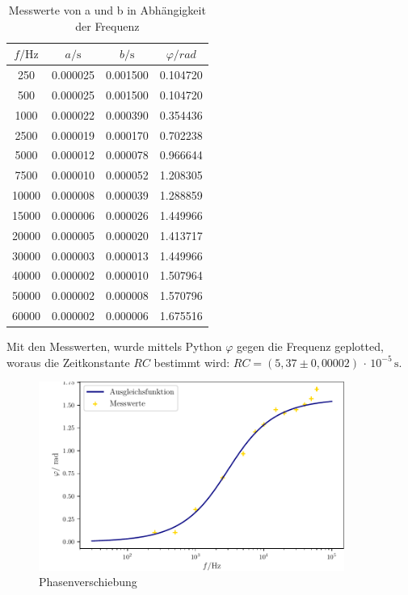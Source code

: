 \begin{table}
  \centering
  \caption{Messwerte von a und b in Abhängigkeit der Frequenz}
  \label{tab:ab}
  \begin{tabular}{c c c c}
    \toprule
    $f/\unit{\hertz}$ & $a/\unit{\second}$ & $b/\unit{\second}$ & $\varphi / rad$ \\
    \midrule      
      250 & 0.000025 & 0.001500 & 0.104720 \\
      500  &0.000025 & 0.001500 & 0.104720\\
      1000 & 0.000022&  0.000390 & 0.354436\\
      2500 & 0.000019 & 0.000170&  0.702238\\
      5000&  0.000012 & 0.000078&  0.966644\\
      7500 & 0.000010 & 0.000052 & 1.208305\\
      10000 & 0.000008 & 0.000039&  1.288859\\
      15000 & 0.000006 & 0.000026 & 1.449966\\
      20000 & 0.000005 & 0.000020 & 1.413717\\
      30000 & 0.000003 & 0.000013 & 1.449966\\
      40000 & 0.000002  &0.000010 & 1.507964\\
      50000&  0.000002 & 0.000008 & 1.570796\\
      60000 & 0.000002 & 0.000006 & 1.675516\\
    \bottomrule
  \end{tabular}
\end{table}

Mit den Messwerten, wurde mittels Python $\varphi$ gegen die Frequenz geplotted, woraus die Zeitkonstante $RC$ bestimmt wird: $RC = (5,37 \pm 0,00002) \, \cdot \, 10^{-5} \, \unit{\second}$.

\begin{figure}
  \centering
  \includegraphics[width=100mm,scale=0.5]{build/plot3.pdf}
  \caption{Phasenverschiebung}
  \label{fig:plot3}
\end{figure}

